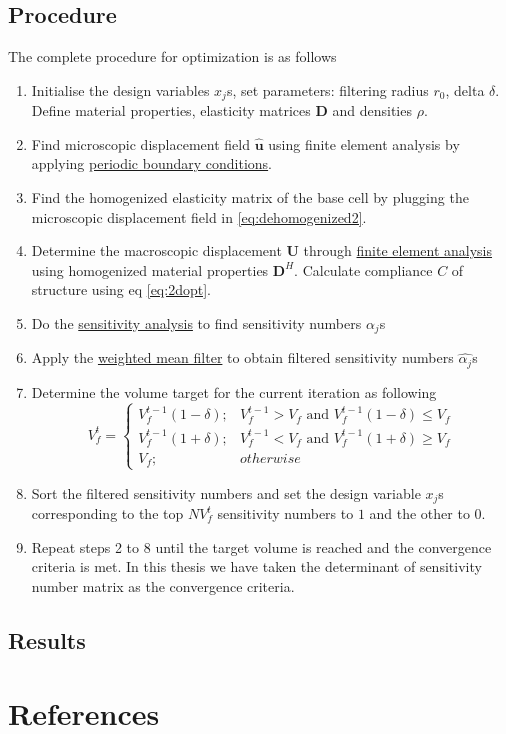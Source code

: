 \documentclass[10pt]{article}
\newcommand{\e}[1]{\textbf{#1}}
\begin{document}
\subsection{Procedure}
The complete procedure for optimization is as follows
\begin{enumerate}[start=1,label={Step \arabic*:}]
\item Initialise the design variables $x_j$s, set parameters: filtering radius $r_0$, delta $\delta$. Define material properties, elasticity matrices $\e D$ and densities $\rho$.
\item Find microscopic displacement field $\hat{\e u}$ using finite element analysis by applying \hyperref[sec:pbc]{periodic boundary conditions}.
\item Find the homogenized elasticity matrix of the base cell by plugging the microscopic displacement field in \eqref{eq:dehomogenized2}.
\item Determine the macroscopic displacement $\e U$ through \hyperref[eq:KM]{finite element analysis} using homogenized material properties $\e D^H$. Calculate compliance $C$ of structure using eq \eqref{eq:2dopt}.
\item Do the \hyperref[eq:senanal]{sensitivity analysis} to find sensitivity numbers $\alpha_j$s
\item Apply the \hyperref[eq:wmfilter]{weighted mean filter} to obtain filtered sensitivity numbers $\hat{\alpha_j}$s
\item Determine the volume target for the current iteration as following
\begin{equation}
V^t_f = 
\begin{cases}
V^{t-1}_f(1-\delta);& V^{t-1}_f>V_f \text{ and } V^{t-1}_f(1-\delta) \leq V_f\\
V^{t-1}_f(1+\delta);& V^{t-1}_f<V_f \text{ and } V^{t-1}_f(1+\delta) \geq V_f\\
V_f;& otherwise
\end{cases}
\end{equation}
\item Sort the filtered sensitivity numbers and set the design variable $x_j$s corresponding to the top $NV^t_f$ sensitivity numbers to $1$ and the other to $0$.
\item Repeat steps 2 to 8 until the target volume is reached and the convergence criteria is met. In this thesis we have taken the determinant of sensitivity number matrix as the convergence criteria.
\end{enumerate}

\subsection{Results}

\newpage
\section{References}


\end{document}
